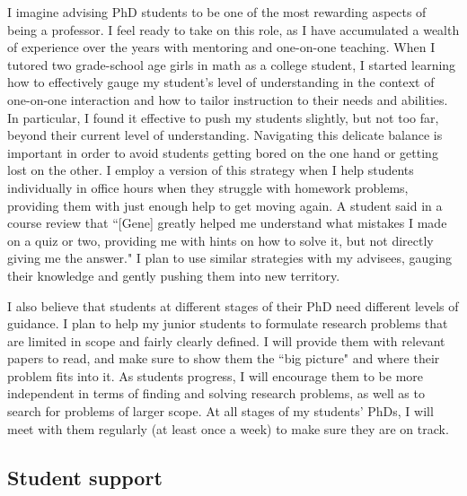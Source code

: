 \documentclass[11pt]{article}
\begin{document}
I imagine advising PhD students to be one of the most rewarding aspects of being a professor. I feel ready to take on this role, as I have accumulated a wealth of experience over the years with mentoring and one-on-one teaching. When I tutored two grade-school age girls in math as a college student, I started learning how to effectively gauge my student's level of understanding in the context of one-on-one interaction and how to tailor instruction to their needs and abilities. In particular, I found it effective to push my students slightly, but not too far, beyond their current level of understanding. Navigating this delicate balance is important in order to avoid students getting bored on the one hand or getting lost on the other. I employ a version of this strategy when I help students individually in office hours when they struggle with homework problems, providing them with just enough help to get moving again. A student said in a course review that ``[Gene] greatly helped me understand what mistakes I made on a quiz or two, providing me with hints on how to solve it, but not directly giving me the answer." I plan to use similar strategies with my advisees, gauging their knowledge and gently pushing them into new territory.

I also believe that students at different stages of their PhD need different levels of guidance. I plan to help my junior students to formulate research problems that are limited in scope and fairly clearly defined. I will provide them with relevant papers to read, and make sure to show them the ``big picture" and where their problem fits into it. As students progress, I will encourage them to be more independent in terms of finding and solving research problems, as well as to search for problems of larger scope. At all stages of my students' PhDs, I will meet with them regularly (at least once a week) to make sure they are on track. 

\subsection*{Student support}
\end{document}
